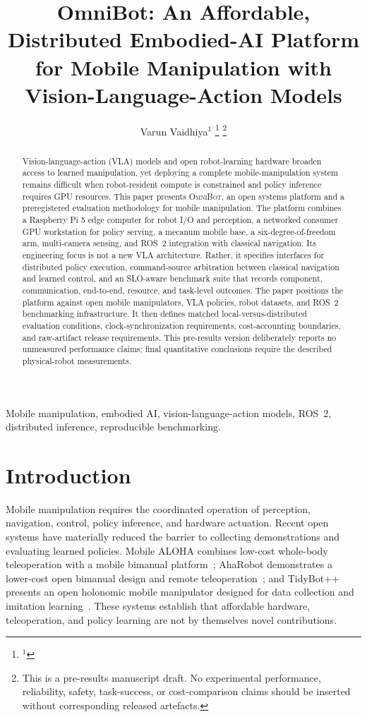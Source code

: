 \documentclass[letterpaper,10pt,conference]{ieeeconf}
\title{\LARGE \bf
OmniBot: An Affordable, Distributed Embodied-AI Platform for Mobile Manipulation with Vision-Language-Action Models
}
\author{Varun Vaidhiya$^{1}$%
\thanks{$^{1}$\TBD{Confirm affiliation, postal address, and contact email before submission.}}
\thanks{This is a pre-results manuscript draft. No experimental performance, reliability, safety, task-success, or cost-comparison claims should be inserted without corresponding released artefacts.}
}
\newcommand{\OmniBot}{\textsc{OmniBot}}
\begin{document}
\maketitle

\begin{abstract}
Vision-language-action (VLA) models and open robot-learning hardware broaden access to learned manipulation, yet deploying a complete mobile-manipulation system remains difficult when robot-resident compute is constrained and policy inference requires GPU resources. This paper presents \OmniBot{}, an open systems platform and a preregistered evaluation methodology for mobile manipulation. The platform combines a Raspberry Pi 5 edge computer for robot I/O and perception, a networked consumer GPU workstation for policy serving, a mecanum mobile base, a six-degree-of-freedom arm, multi-camera sensing, and ROS~2 integration with classical navigation. Its engineering focus is not a new VLA architecture. Rather, it specifies interfaces for distributed policy execution, command-source arbitration between classical navigation and learned control, and an SLO-aware benchmark suite that records component, communication, end-to-end, resource, and task-level outcomes. The paper positions the platform against open mobile manipulators, VLA policies, robot datasets, and ROS~2 benchmarking infrastructure. It then defines matched local-versus-distributed evaluation conditions, clock-synchronization requirements, cost-accounting boundaries, and raw-artifact release requirements. This pre-results version deliberately reports no unmeasured performance claims; final quantitative conclusions require the described physical-robot measurements.
\end{abstract}

\begin{keywords}
Mobile manipulation, embodied AI, vision-language-action models, ROS~2, distributed inference, reproducible benchmarking.
\end{keywords}

\section{Introduction}
\label{sec:intro}

Mobile manipulation requires the coordinated operation of perception, navigation, control, policy inference, and hardware actuation. Recent open systems have materially reduced the barrier to collecting demonstrations and evaluating learned policies. Mobile ALOHA combines low-cost whole-body teleoperation with a mobile bimanual platform~\cite{fu2024mobile}; AhaRobot demonstrates a lower-cost open bimanual design and remote teleoperation~\cite{cui2025aharobot}; and TidyBot++ presents an open holonomic mobile manipulator designed for data collection and imitation learning~\cite{wu2025tidybot}. These systems establish that affordable hardware, teleoperation, and policy learning are not by themselves novel contributions.
\end{document}
